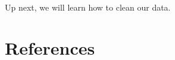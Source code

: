 \documentclass[
  letterpaper,
  DIV=11,
  numbers=noendperiod]{scrreprt}
\newlength{\cslhangindent}
\newlength{\cslentryspacingunit} %
\newenvironment{CSLReferences}[2] %
 {%
  \setlength{\parindent}{0pt}
  \ifodd #1
  \let\oldpar\par
  \def\par{\hangindent=\cslhangindent\oldpar}
  \fi
  \setlength{\parskip}{#2\cslentryspacingunit}
 }%
 {}
\begin{document}
Up next, we will learn how to clean our data.


\hypertarget{references}{%
\chapter*{References}\label{references}}

\hypertarget{refs}{}
\begin{CSLReferences}{0}{0}
\end{CSLReferences}
\end{document}
